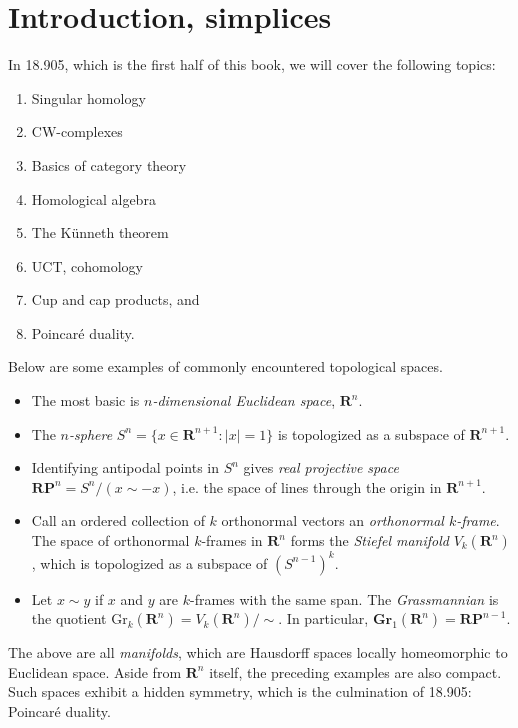 
\section{Introduction, simplices}\label{905}
In 18.905, which is the first half of this book, we will cover the following topics:
\begin{enumerate}
    \item Singular homology
    \item CW-complexes
    \item Basics of category theory
    \item Homological algebra
    \item The K\"{u}nneth theorem
    \item UCT, cohomology
    \item Cup and cap products, and
    \item Poincar\'{e} duality.
\end{enumerate}
Below are some examples of commonly encountered topological spaces.
\begin{itemize}
    \item The most basic is \emph{$n$-dimensional Euclidean space}, $\mathbf{R}^n$.
    \item The \emph{$n$-sphere} $S^n=\{x\in \mathbf{R}^{n+1}:|x|=1\}$ is topologized as a subspace of $\mathbf{R}^{n+1}$.
    \item Identifying antipodal points in $S^n$ gives \emph{real projective space} $\mathbf{RP}^n=S^n / (x\sim -x)$, i.e. the space of lines through the origin in $\mathbf{R}^{n+1}$.
    \item Call an ordered collection of $k$ orthonormal vectors an \emph{orthonormal $k$-frame}. The space of orthonormal $k$-frames in $\mathbf{R}^n$ forms the \emph{Stiefel manifold} $V_k(\mathbf{R}^n)$, which is topologized as a subspace of $(S^{n-1})^k$.
    \item Let $x\sim y$ if $x$ and $y$ are $k$-frames with the same span. The \emph{Grassmannian} is the quotient $\mathrm{Gr}_k(\mathbf{R}^n)=V_k(\mathbf{R}^n)/\sim$. In particular, $\mathbf{Gr}_1(\mathbf{R}^n) = \mathbf{RP}^{n-1}$.
\end{itemize}
The above are all \emph{manifolds}, which are Hausdorff spaces locally homeomorphic to Euclidean space. Aside from $\mathbf{R}^n$ itself, the preceding examples are also compact. Such spaces exhibit a hidden symmetry, which is the culmination of 18.905: Poincar\'{e} duality.

